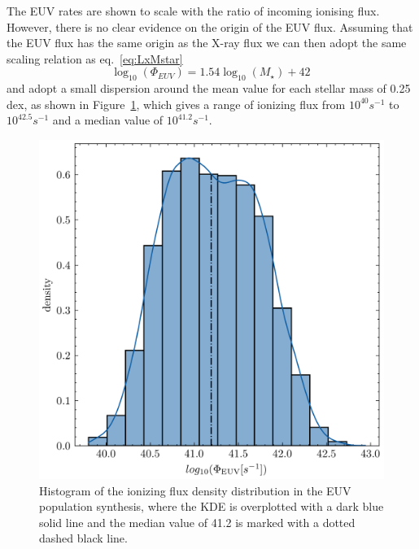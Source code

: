\documentclass[fleqn,usenatbib,letters]{mnras}
\begin{document}
The EUV rates are shown to scale with the ratio of incoming ionising flux. However, there is no clear evidence on the origin of the EUV flux. Assuming that the EUV flux has the same origin as the X-ray flux we can then adopt the same scaling relation as eq.~\ref{eq:LxMstar}
\begin{equation} \label{eq:PhiEUVMstar}
    \log_{10}(\Phi_{EUV}) = 1.54 \log_{10}(M_\star) + 42 \,
\end{equation}
and adopt a small dispersion around the mean value for each stellar mass of 0.25 dex, as shown in Figure~\ref{fig:phiEUV}, which gives a range of ionizing flux from $10^{40} s^{-1}$ to $10^{42.5} s^{-1}$ and a median value of $10^{41.2} s^{-1}$.
\begin{figure}
    \includegraphics[width=0.95\columnwidth]{phi_EUV}
    \caption{Histogram of the ionizing flux density distribution in the EUV population synthesis, where the KDE is overplotted with a dark blue solid line and the median value of 41.2 is marked with a dotted dashed black line. \label{fig:phiEUV}}
\end{figure}
\end{document}
